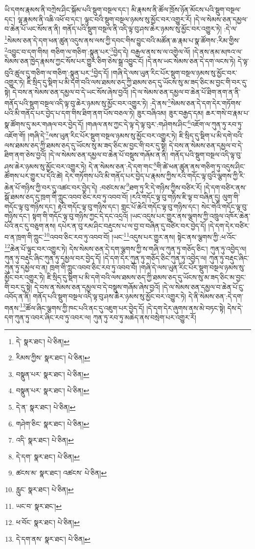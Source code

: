 ཡི་དགས་རྣམས་ནི་བཀྲེས་ཤིང་སྐོམ་པའི་སྡུག་བསྔལ་དང་། མི་རྣམས་ནི་ཚོལ་ཁྲོས་ཉོན་མོངས་པའི་སྡུག་བསྔལ་དང་། ལྷ་རྣམས་ནི་འཆི་འཕོ་བ་དང་། ལྟུང་བའི་སྡུག་བསྔལ་ཉམས་སུ་མྱོང་བར་འགྱུར་རོ། །དེ་ལ་སེམས་ཅན་དམྱལ་བ་ཆེན་པོ་ཡང་སོས་ན་ནི། གནོད་པའི་སྡུག་བསྔལ་ནི་འདི་ལྟ་བུ་ཤས་ཆེར་ཉམས་སུ་མྱོང་བར་འགྱུར་ཏེ། :དེ་ལ་\footnote{དེ་  སྣར་ཐང་།  པེ་ཅིན། }སེམས་ཅན་དེ་དག་ཕན་ཚུན་འདུས་ནས་ལས་ཀྱི་དབང་གིས་བྱུང་བའི་མཚོན་ཆ་རྣམ་པ་སྣ་ཚོགས་:རིམ་གྱིས་\footnote{རིམས་ཀྱིས་  སྣར་ཐང་།  པེ་ཅིན། }འབྱུང་བ་དག་གིས། གཅིག་ལ་གཅིག་:སྣུན་པར་\footnote{བསྣུན་པར་  སྣར་ཐང་།  པེ་ཅིན། }བྱེད་དེ། བརྒྱལ་ནས་ས་ལ་འགྱེལ་ལོ། །དེ་ནས་ནམ་མཁའ་ལ་སེམས་ཅན་ཁྱེད་རྣམས་ཀྱང་སོས་པར་གྱུར་ཅིག་ཅེས་སྒྲ་འབྱུང་ངོ། །དེ་ནས་ཡང་སེམས་ཅན་དེ་དག་ལངས་ཏེ། དེ་ལྟ་བུའི་ཚུལ་དུ་གཅིག་ལ་གཅིག་:སྣུན་པར་\footnote{བསྣུན་པར་  སྣར་ཐང་།  པེ་ཅིན། }བྱེད་དོ། །གཞི་དེ་ལས་ཡུན་རིང་པོར་སྡུག་བསྔལ་ཉམས་སུ་མྱོང་བར་འགྱུར་ཏེ། ཇི་སྲིད་དུ་སྡིག་པ་མི་དགེ་བའི་ལས་ཐམས་ཅད་ཀྱི་ཐམས་ཅད་དུ་ཡོངས་སུ་མ་ཟད་ཅིང་མ་བྱང་གི་བར་དུ་སྟེ། དེ་བས་ན་སེམས་ཅན་དམྱལ་བ་དེ་ཡང་སོས་ཞེས་བྱའོ། །དེ་ལ་སེམས་ཅན་དམྱལ་བ་ཆེན་པོ་ཐིག་ནག་ན་ནི་གནོད་པའི་སྡུག་བསྔལ་འདི་ལྟ་བུ་ཆེར་ཉམས་སུ་མྱོང་བར་འགྱུར་ཏེ། :དེ་ནས་\footnote{དེ་ན་  སྣར་ཐང་།  པེ་ཅིན། }སེམས་ཅན་དེ་དག་དེར་གཏོགས་པའི་མི་གནོད་པར་བྱེད་པ་དག་གིས་ཐིག་ནག་པོས་བཅལ་ཏེ། ཟུར་བཞིའམ། ཟུར་བརྒྱད་དམ། ཆར་གསེ་བ་རྣམ་པ་སྣ་ཚོགས་དུ་མར་གཞལ་བར་བྱེད་དོ། །གཞལ་ནས་ཀྱང་དེ་ལྟ་དེ་ལྟ་བུར་:གཤེགས་ཤིང་\footnote{གཤེག་ཅིང་  སྣར་ཐང་།  པེ་ཅིན། }འཇོག་ལ་ཀུན་ཏུ་རབ་ཏུ་འཇོག་གོ། །གཞི་དེ་\footnote{འདི་  སྣར་ཐང་།  པེ་ཅིན། }ལས་ཡུན་རིང་པོར་སྡུག་བསྔལ་ཉམས་སུ་མྱོང་བར་འགྱུར་ཏེ། ཇི་སྲིད་དུ་སྡིག་པ་མི་དགེ་བའི་ལས་ཐམས་ཅད་ཀྱི་ཐམས་ཅད་དུ་ཡོངས་སུ་མ་ཟད་ཅིང་མ་བྱང་གི་བར་དུ་སྟེ། དེ་བས་ན་སེམས་ཅན་དམྱལ་བ་དེ་ཐིག་ནག་ཅེས་བྱའོ། །དེ་ལ་སེམས་ཅན་དམྱལ་བ་ཆེན་པོ་བསྡུས་གཞོམ་ན་ནི། གནོད་པའི་སྡུག་བསྔལ་འདི་ལྟ་བུ་ཤས་ཆེར་ཉམས་སུ་མྱོང་བར་འགྱུར་ཏེ། དེ་ན་སེམས་ཅན་:དེ་དག་གང་\footnote{དེ་དག་  སྣར་ཐང་།  པེ་ཅིན། }གི་ཚེ་ཕན་ཚུན་ནས་གཅིག་ཏུ་འདུས་ཤིང་ཚོགས་པར་གྱུར་པ་དེའི་ཚེ། དེར་གཏོགས་པའི་མི་གནོད་པར་བྱེད་པ་རྣམས་ཀྱིས་རའི་གདོང་ལྟ་བུའི་ལྕགས་ཀྱི་རི་ཆེན་པོ་གཉིས་ཀྱི་བར་དུ་འཚང་བར་བྱེད་དེ། :བཙངས་མ་\footnote{ཚངས་མ་  སྣར་ཐང་། འཚངས་  པེ་ཅིན། }ཐག་ཏུ་རི་དེ་གཉིས་ཀྱིས་བཙིར་རོ། །དེ་དག་བཙིར་ནས་སྒོ་ཐམས་ཅད་དུ་ཁྲག་གི་ཀླུང་འབབ་ཅིང་རབ་ཏུ་འབབ་བོ། །རའི་གདོང་ལྟ་བུ་གཉིས་ཇི་ལྟ་བ་བཞིན་དུ། ལུག་གི་གདོང་ལྟ་བུ་གཉིས་དང་། རྟའི་གདོང་ལྟ་བུ་གཉིས་དང་། གླང་པོ་ཆེའི་གདོང་ལྟ་བུ་གཉིས་དང་། སེང་གེའི་གདོང་ལྟ་བུ་གཉིས་དང་། སྟག་གི་གདོང་ལྟ་བུ་གཉིས་ཀྱང་དེ་དང་འདྲའོ། །ཡང་འདུས་པར་གྱུར་ནས་ལྕགས་ཀྱི་འཁྲུལ་འཁོར་ཆེན་པོའི་ནང་དུ་བཅུག་ནས། དཔེར་ན་བུ་རམ་ཤིང་བརྡུངས་པ་ལ་བྱ་བ་བཞིན་དུ་བཙིར་བར་བྱེད་དོ། །དེ་དག་དེར་བཙིར་བ་ན་ཁྲག་གི་ཀླུང་\footnote{རླུང་  སྣར་ཐང་།  པེ་ཅིན། }འབབ་ཅིང་རབ་ཏུ་འབབ་བོ། །ཡང་\footnote{ཡང་བ་  སྣར་ཐང་། }འདུས་པར་གྱུར་ནས། སྟེང་ནས་ལྕགས་ཀྱི་:ཕ་འོང་\footnote{ཕ་བོང་  སྣར་ཐང་།  པེ་ཅིན། }ཆེན་པོ་ལྟུང་བར་འགྱུར་ཏེ། དེས་སེམས་ཅན་དེ་དག་ལྕགས་ཀྱི་ས་གཞི་ལ་ཀུན་ཏུ་གཅོད་ཅིང་། ཀུན་ཏུ་འབྱེད་ལ། ཀུན་ཏུ་བརྡུང་ཞིང་ཀུན་ཏུ་དམྱལ་བར་བྱེད་དོ། །དེ་དག་དེར་ཀུན་ཏུ་གཅོད་ཅིང་ཀུན་ཏུ་འབྱེད་ལ། ཀུན་ཏུ་བརྡུང་ཞིང་ཀུན་ཏུ་དམྱལ་བ་ན། ཁྲག་གི་ཀླུང་འབབ་ཅིང་རབ་ཏུ་འབབ་བོ། །གཞི་དེ་ལས་ཡུན་རིང་པོར་སྡུག་བསྔལ་ཉམས་སུ་མྱོང་བར་འགྱུར་ཏེ། ཇི་སྲིད་དུ་སྡིག་པ་མི་དགེ་བའི་ལས་ཐམས་ཅད་ཀྱི་ཐམས་ཅད་དུ་ཡོངས་སུ་མ་ཟད་ཅིང་མ་བྱང་གི་བར་དུ་སྟེ། དེ་བས་ན་སེམས་ཅན་དམྱལ་བ་དེ་བསྡུས་གཞོམ་ཞེས་བྱའོ། །དེ་ལ་སེམས་ཅན་དམྱལ་བ་ཆེན་པོ་ངུ་འབོད་ན་ནི། གནོད་པའི་སྡུག་བསྔལ་འདི་ལྟ་བུ་ཤས་ཆེར་ཉམས་སུ་མྱོང་བར་འགྱུར་ཏེ། དེ་ནི་སེམས་ཅན་:དེ་དག་གནས་\footnote{དེ་དག་ནས་  སྣར་ཐང་།  པེ་ཅིན། }ཚོལ་ཞིང་ལྕགས་ཀྱི་ཁང་པའི་ནང་དུ་འཇུག་པར་བྱེད་དོ། །དེ་དག་དེར་ཞུགས་ནས་མེ་བཏང་སྟེ། དེས་དེ་དག་ཀུན་ཏུ་འབར་ཞིང་རབ་ཏུ་འབར་ལ། ཀུན་ཏུ་རབ་ཏུ་མཆེད་ནས་བསྲེག་པར་འགྱུར་རོ། 
